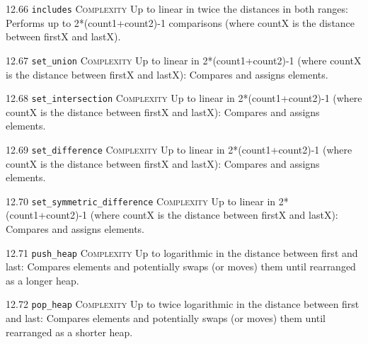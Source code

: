 \noindent\textcolor{corange}{12.66 \texttt{includes}} \textsc{Complexity} Up to linear in twice the distances in both ranges: Performs up to 2*(count1+count2)-1 comparisons (where countX is the distance between firstX and lastX). \vspace{0.5em}

\noindent\textcolor{corange}{12.67 \texttt{set\_union}} \textsc{Complexity} Up to linear in 2*(count1+count2)-1 (where countX is the distance between firstX and lastX): Compares and assigns elements. \vspace{0.5em}

\noindent\textcolor{corange}{12.68 \texttt{set\_intersection}} \textsc{Complexity} Up to linear in 2*(count1+count2)-1 (where countX is the distance between firstX and lastX): Compares and assigns elements. \vspace{0.5em}

\noindent\textcolor{corange}{12.69 \texttt{set\_difference}} \textsc{Complexity} Up to linear in 2*(count1+count2)-1 (where countX is the distance between firstX and lastX): Compares and assigns elements. \vspace{0.5em}

\noindent\textcolor{corange}{12.70 \texttt{set\_symmetric\_difference}} \textsc{Complexity} Up to linear in 2*(count1+count2)-1 (where countX is the distance between firstX and lastX): Compares and assigns elements. \vspace{0.5em}

\noindent\textcolor{clime}{12.71 \texttt{push\_heap}} \textsc{Complexity} Up to logarithmic in the distance between first and last: Compares elements and potentially swaps (or moves) them until rearranged as a longer heap. \vspace{0.5em}

\noindent\textcolor{clime}{12.72 \texttt{pop\_heap}} \textsc{Complexity} Up to twice logarithmic in the distance between first and last: Compares elements and potentially swaps (or moves) them until rearranged as a shorter heap. \vspace{0.5em}

